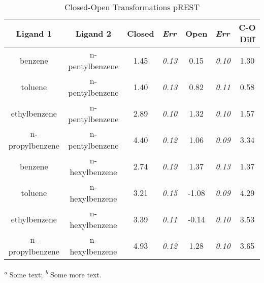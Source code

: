 \documentclass[T4paper.tex]{subfiles}
\begin{document}
\begin{table}[!htb]
\centering
\caption{Closed-Open Transformations pREST}
\label{tbl:C-O_pREST}
\begin{tabular}{|c|c|c|l|c|l|c|}
\hline
\textbf{Ligand 1}                       & \textbf{Ligand 2}                       & {\color[HTML]{800080} \textbf{Closed}} & {\color[HTML]{800080} \textit{Err}} & {\color[HTML]{008000} \textbf{Open}} & {\color[HTML]{008000} \textit{Err}} & \textbf{C-O Diff}            \\ \hline
\cellcolor[HTML]{800080}benzene         & \cellcolor[HTML]{008000}n-pentylbenzene & 1.45                                   & \textit{0.13}                       & 0.15                                & \textit{0.10}                       & \cellcolor[HTML]{FFCCC9}1.30 \\ \hline
\cellcolor[HTML]{800080}toluene         & \cellcolor[HTML]{008000}n-pentylbenzene & 1.40                                   & \textit{0.13}                       & 0.82                                 & \textit{0.11}                       & \cellcolor[HTML]{FFCCC9}0.58 \\ \hline
\cellcolor[HTML]{800080}ethylbenzene    & \cellcolor[HTML]{008000}n-pentylbenzene & 2.89                                   & \textit{0.10}                       & 1.32                                 & \textit{0.10}                       & \cellcolor[HTML]{FFCCC9}1.57 \\ \hline
\cellcolor[HTML]{800080}n-propylbenzene & \cellcolor[HTML]{008000}n-pentylbenzene & 4.40                                   & \textit{0.12}                       & 1.06                                & \textit{0.09}                       & \cellcolor[HTML]{FFCCC9}3.34 \\ \hline
\cellcolor[HTML]{800080}benzene         & \cellcolor[HTML]{008000}n-hexylbenzene  & 2.74                                   & \textit{0.19}                       & 1.37                                & \textit{0.13}                       & \cellcolor[HTML]{FFCCC9}1.37 \\ \hline
\cellcolor[HTML]{800080}toluene         & \cellcolor[HTML]{008000}n-hexylbenzene  & 3.21                                   & \textit{0.15}                       & -1.08                                & \textit{0.09}                       & \cellcolor[HTML]{FFCCC9}4.29 \\ \hline
\cellcolor[HTML]{800080}ethylbenzene    & \cellcolor[HTML]{008000}n-hexylbenzene  & 3.39                                   & \textit{0.11}                       & -0.14                                & \textit{0.10}                       & \cellcolor[HTML]{FFCCC9}3.53 \\ \hline
\cellcolor[HTML]{800080}n-propylbenzene & \cellcolor[HTML]{008000}n-hexylbenzene  & 4.93                                   & \textit{0.12}                       & 1.28                                 & \textit{0.10}                       & \cellcolor[HTML]{FFCCC9}3.65 \\ \hline
\end{tabular}

  \textsuperscript{\emph{a}} Some text;
  \textsuperscript{\emph{b}} Some more text.
\end{table}
\end{document}
